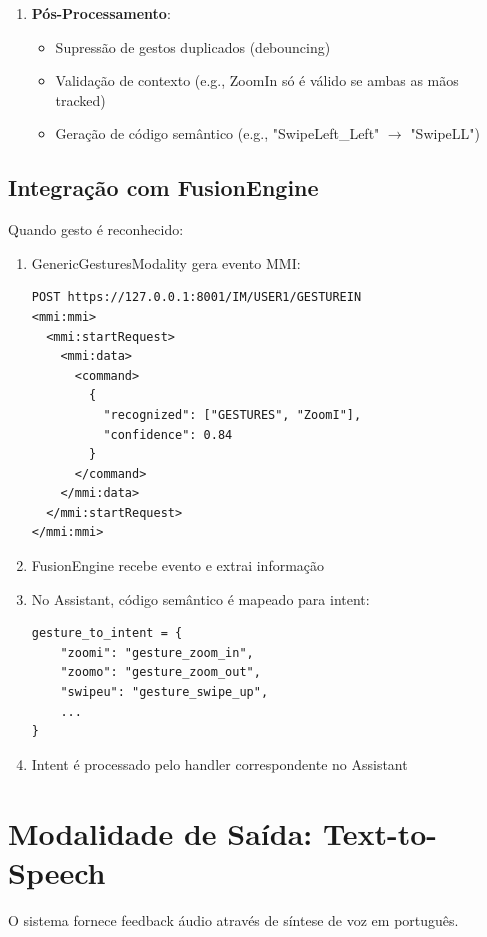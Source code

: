 \begin{enumerate}
    \item \textbf{Pós-Processamento}:
    \begin{itemize}
        \item Supressão de gestos duplicados (debouncing)
        \item Validação de contexto (e.g., ZoomIn só é válido se ambas as mãos tracked)
        \item Geração de código semântico (e.g., "SwipeLeft\_Left" $\rightarrow$ "SwipeLL")
    \end{itemize}
\end{enumerate}

\subsection{Integração com FusionEngine}

Quando gesto é reconhecido:

\begin{enumerate}
    \item GenericGesturesModality gera evento MMI:
    \begin{verbatim}
POST https://127.0.0.1:8001/IM/USER1/GESTUREIN
<mmi:mmi>
  <mmi:startRequest>
    <mmi:data>
      <command>
        {
          "recognized": ["GESTURES", "ZoomI"],
          "confidence": 0.84
        }
      </command>
    </mmi:data>
  </mmi:startRequest>
</mmi:mmi>
    \end{verbatim}

    \item FusionEngine recebe evento e extrai informação

    \item No Assistant, código semântico é mapeado para intent:
    \begin{verbatim}
gesture_to_intent = {
    "zoomi": "gesture_zoom_in",
    "zoomo": "gesture_zoom_out",
    "swipeu": "gesture_swipe_up",
    ...
}
    \end{verbatim}

    \item Intent é processado pelo handler correspondente no Assistant
\end{enumerate}

\section{Modalidade de Saída: Text-to-Speech}

O sistema fornece feedback áudio através de síntese de voz em português.


